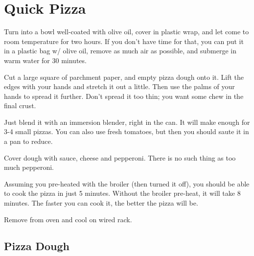 \section{Quick Pizza}
\begin{recipe}



Turn into a bowl well-coated with olive oil, cover in plastic wrap, and let
come to room temperature for two hours. If you don't have time for that, you
can put it in a plastic bag w/ olive oil, remove as much air as possible, and
submerge in warm water for 30 minutes.

Cut a large square of parchment paper, and empty pizza dough onto it. Lift the
edges with your hands and stretch it out a little. Then use the palms of your
hands to spread it further. Don't spread it too thin; you want some chew in
the final crust.


Just blend it with an immersion blender, right in the can. It will make enough
for 3-4 small pizzas. You can also use fresh tomatoes, but then you should saute it in a pan to reduce.


Cover dough with sauce, cheese and pepperoni. There is no such thing as too much
pepperoni.

Assuming you pre-heated with the broiler (then turned it off), you should be able
to cook the pizza in just 5 minutes. Without the broiler pre-heat, it will take
8 minutes. The faster you can cook it, the better the pizza will be.

Remove from oven and cool on wired rack.

\subsection{Pizza Dough}


\end{recipe}
